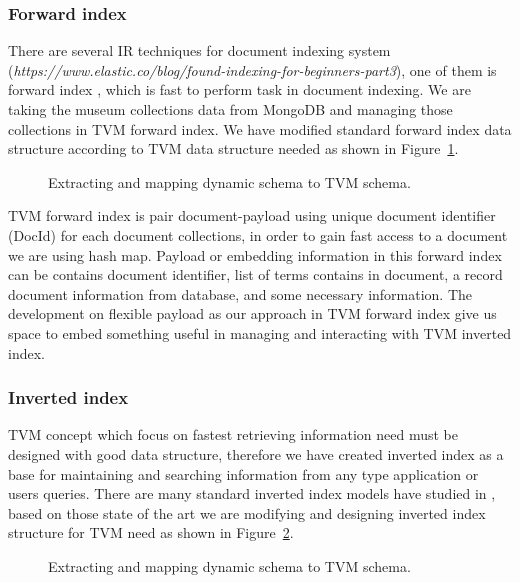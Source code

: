 \subsubsection{Forward index} There are several IR techniques for document indexing system (\textit{https://www.elastic.co/blog/found-indexing-for-beginners-part3}), one of them is forward index \cite{BrinPage}, which is fast to perform task in document indexing. We are taking the museum collections data from MongoDB and managing those collections in TVM forward index. We have modified standard forward index data structure according to TVM data structure needed as shown in Figure~\cref{fig:tvmForwardIndex}.

\begin{figure}[ht]
	\caption{Extracting and mapping dynamic schema to TVM schema.}\label{fig:tvmForwardIndex}
\end{figure}

TVM forward index is pair document-payload using unique document identifier (DocId) for each document collections, in order to gain fast access to a document we are using hash map. Payload or embedding information in this forward index can be contains document identifier, list of terms contains in document, a record document information from database, and some necessary information. The development on flexible payload as our approach in TVM forward index give us space to embed something useful in managing and interacting with TVM inverted index.

\subsubsection{Inverted index} TVM concept which focus on fastest retrieving information need must be designed with good data structure, therefore we have created inverted index as a base for maintaining and searching information from any type application or users queries. There are many standard inverted index models have studied in \cite{ZobelMoffat,ManningRaghavanSchutze,PanevBerberich}, based on those state of the art we are modifying and designing inverted index structure for TVM need \cite{AnggaiBlekanovSergeev2017} as shown in Figure~\cref{fig:tvmInvertedIndex}.

\begin{figure}[ht]
	\caption{Extracting and mapping dynamic schema to TVM schema.}\label{fig:tvmInvertedIndex}
\end{figure}


